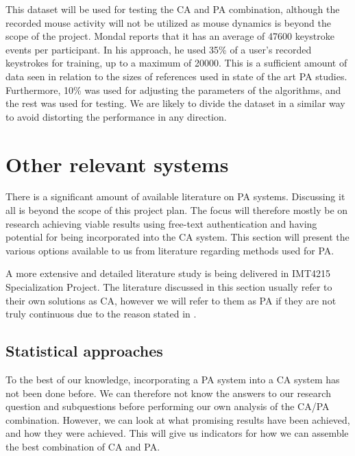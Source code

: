 \documentclass[informationsecurity]{gucmasterproject}
\begin{document}
This dataset will be used for testing the CA and PA combination, although the recorded mouse activity will not be utilized as mouse dynamics is beyond the scope of the project.
Mondal reports that it has an average of 47600 keystroke events per participant. 
In his approach, he used 35\% of a user's recorded keystrokes for training, up to a maximum of 20000.
This is a sufficient amount of data seen in relation to the sizes of references used in state of the art PA studies.
Furthermore, 10\% was used for adjusting the parameters of the algorithms, and the rest was used for testing.
We are likely to divide the dataset in a similar way to avoid distorting the performance in any direction. 


\section{Other relevant systems}
\label{sec:related-other}
There is a significant amount of available literature on PA systems.
Discussing it all is beyond the scope of this project plan. The focus will therefore mostly be on research achieving viable results using free-text authentication and having potential for being incorporated into the CA system.
This section will present the various options available to us from literature regarding methods used for PA.

A more extensive and detailed literature study is being delivered in IMT4215 Specialization Project.
The literature discussed in this section usually refer to their own solutions as CA, however we will refer to them as PA if they are not truly continuous due to the reason stated in .

\subsection{Statistical approaches}
To the best of our knowledge, incorporating a PA system into a CA system has not been done before. 
We can therefore not know the answers to our research question and subquestions before performing our own analysis of the CA/PA combination.
However, we can look at what promising results have been achieved, and how they were achieved.
This will give us indicators for how we can assemble the best combination of CA and PA.
\end{document}
